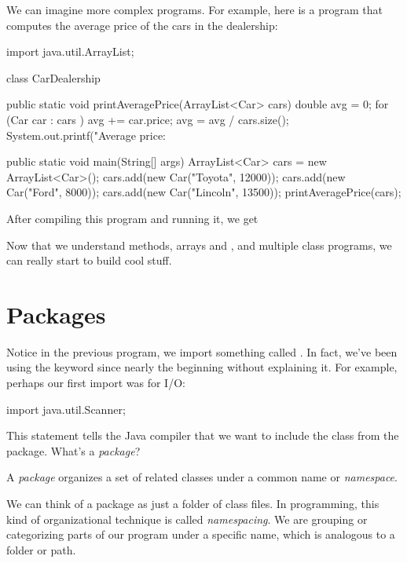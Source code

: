 We can imagine more complex programs. For example, here is a program that computes the average price of the cars in the dealership:

\begin{code}
import java.util.ArrayList;

class CarDealership {
  
  public static void printAveragePrice(ArrayList<Car> cars) {
    double avg = 0;
    for (Car car : cars ) {
      avg += car.price;
    }
    avg = avg / cars.size();
    System.out.printf("Average price: %
  }
    
  public static void main(String[] args) {
    ArrayList<Car> cars = new ArrayList<Car>();
    cars.add(new Car("Toyota", 12000));
    cars.add(new Car("Ford", 8000));
    cars.add(new Car("Lincoln", 13500));
    printAveragePrice(cars);
  }
}
\end{code}

After compiling this program and running it, we get


Now that we understand methods, arrays and , and multiple class programs, we can really start to build cool stuff.

\section{Packages}

Notice in the previous  program, we import something called . In fact, we've been using the  keyword since nearly the beginning without explaining it. For example, perhaps our first import was for I/O:

\begin{code}
import java.util.Scanner;
\end{code}

This  statement tells the Java compiler that we want to include the  class from the  package. What's a \emph{package}?

\begin{definition}
A \emph{package} organizes a set of related classes under a common name or \emph{namespace}.
\end{definition}

We can think of a package as just a folder of class files. In programming, this kind of organizational technique is called \emph{namespacing}. We are grouping or categorizing parts of our program under a specific name, which is analogous to a folder or path.

